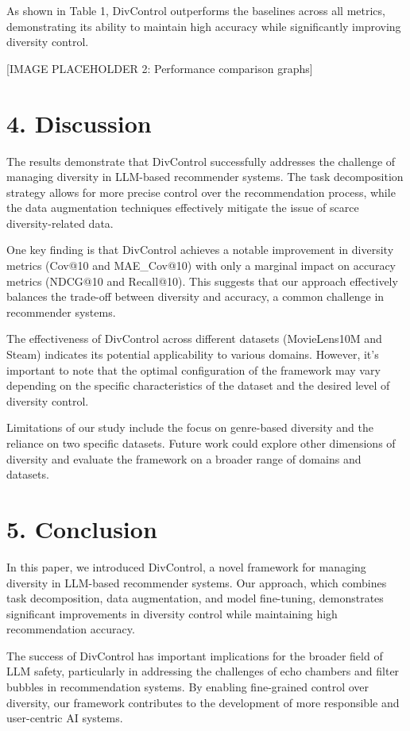 \documentclass[10pt,twocolumn,letterpaper]{article}
\begin{document}
As shown in Table 1, DivControl outperforms the baselines across all metrics, demonstrating its ability to maintain high accuracy while significantly improving diversity control.

[IMAGE PLACEHOLDER 2: Performance comparison graphs]

\section{4. Discussion}

The results demonstrate that DivControl successfully addresses the challenge of managing diversity in LLM-based recommender systems. The task decomposition strategy allows for more precise control over the recommendation process, while the data augmentation techniques effectively mitigate the issue of scarce diversity-related data.

One key finding is that DivControl achieves a notable improvement in diversity metrics (Cov@10 and MAE_Cov@10) with only a marginal impact on accuracy metrics (NDCG@10 and Recall@10). This suggests that our approach effectively balances the trade-off between diversity and accuracy, a common challenge in recommender systems.

The effectiveness of DivControl across different datasets (MovieLens10M and Steam) indicates its potential applicability to various domains. However, it's important to note that the optimal configuration of the framework may vary depending on the specific characteristics of the dataset and the desired level of diversity control.

Limitations of our study include the focus on genre-based diversity and the reliance on two specific datasets. Future work could explore other dimensions of diversity and evaluate the framework on a broader range of domains and datasets.

\section{5. Conclusion}

In this paper, we introduced DivControl, a novel framework for managing diversity in LLM-based recommender systems. Our approach, which combines task decomposition, data augmentation, and model fine-tuning, demonstrates significant improvements in diversity control while maintaining high recommendation accuracy.

The success of DivControl has important implications for the broader field of LLM safety, particularly in addressing the challenges of echo chambers and filter bubbles in recommendation systems. By enabling fine-grained control over diversity, our framework contributes to the development of more responsible and user-centric AI systems.
\end{document}
